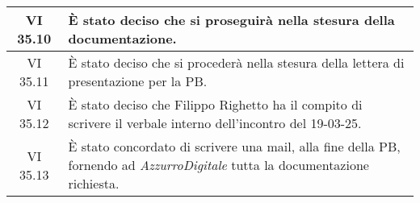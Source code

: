\begin{table}[htbp]
\begin{tabular}{|c|p{}|}
        \hline
        VI 35.10 & È stato deciso che si proseguirà nella stesura della documentazione.\\
        \hline
        VI 35.11 & È stato deciso che si procederà nella stesura della lettera di presentazione per la PB.\\
        \hline
        VI 35.12 & È stato deciso che Filippo Righetto ha il compito di scrivere il verbale interno dell'incontro del 19-03-25.\\
        \hline
        VI 35.13 & È stato concordato di scrivere una mail, alla fine della PB, fornendo ad \emph{AzzurroDigitale} tutta la documentazione richiesta.\\
        \hline
    \end{tabular}
\end{table}


